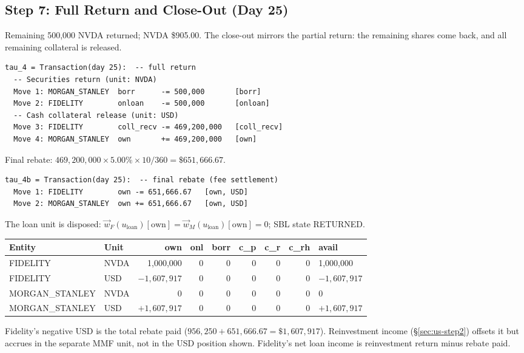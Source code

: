\subsection{Step 7: Full Return and Close-Out (Day 25)}
\label{sec:us-step7}

Remaining 500{,}000 NVDA returned; NVDA \$905.00. The close-out mirrors the partial return: the remaining shares come back, and all remaining collateral is released.

\begin{lstlisting}
tau_4 = Transaction(day 25):  -- full return
  -- Securities return (unit: NVDA)
  Move 1: MORGAN_STANLEY  borr      -= 500,000       [borr]
  Move 2: FIDELITY        onloan    -= 500,000       [onloan]
  -- Cash collateral release (unit: USD)
  Move 3: FIDELITY        coll_recv -= 469,200,000   [coll_recv]
  Move 4: MORGAN_STANLEY  own       += 469,200,000   [own]
\end{lstlisting}

\noindent Final rebate: $469{,}200{,}000 \times 5.00\% \times 10/360 = \$651{,}666.67$.

\begin{lstlisting}
tau_4b = Transaction(day 25):  -- final rebate (fee settlement)
  Move 1: FIDELITY        own -= 651,666.67   [own, USD]
  Move 2: MORGAN_STANLEY  own += 651,666.67   [own, USD]
\end{lstlisting}

\noindent The loan unit is disposed: $\vec{w}_F(u_{\mathrm{loan}})[\mathrm{own}] = \vec{w}_M(u_{\mathrm{loan}})[\mathrm{own}] = 0$; SBL state RETURNED.

\begin{center}\small
\begin{tabular}{l l r r r r r r l}
\toprule
\textbf{Entity} & \textbf{Unit} & own & onl & borr & c\_p & c\_r & c\_rh & avail \\
\midrule
FIDELITY & NVDA & 1{,}000{,}000 & 0 & 0 & 0 & 0 & 0 & 1{,}000{,}000 \\
FIDELITY & USD & $-1{,}607{,}917$ & 0 & 0 & 0 & 0 & 0 & $-1{,}607{,}917$ \\
\midrule
MORGAN\_STANLEY & NVDA & 0 & 0 & 0 & 0 & 0 & 0 & 0 \\
MORGAN\_STANLEY & USD & $+1{,}607{,}917$ & 0 & 0 & 0 & 0 & 0 & $+1{,}607{,}917$ \\
\bottomrule
\end{tabular}
\end{center}

\noindent Fidelity's negative USD is the total rebate paid ($956{,}250 + 651{,}666.67 = \$1{,}607{,}917$). Reinvestment income (\S\ref{sec:us-step2}) offsets it but accrues in the separate MMF unit, not in the USD position shown. Fidelity's net loan income is reinvestment return minus rebate paid.

